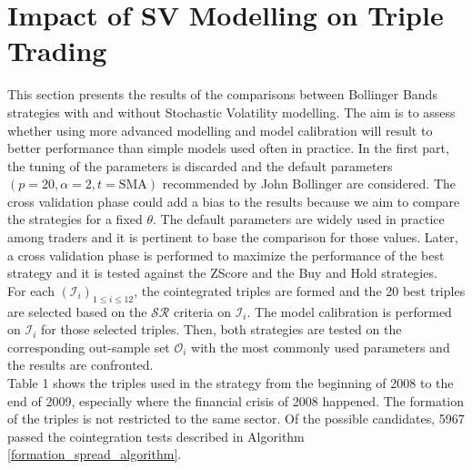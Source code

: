 \documentclass[11pt,a4,twosided,singlespacing,titlepagenumber=on]{scrreprt}
\numberwithin{equation}{chapter} %
\theoremstyle{remark}
\begin{document}
\section{Impact of SV Modelling on Triple Trading}
This section presents the results of the comparisons between Bollinger Bands strategies with and without Stochastic Volatility modelling. The aim is to assess whether using more advanced modelling and model calibration will result to better performance than simple models used often in practice. In the first part, the tuning of the parameters is discarded and the default parameters $(p=20, \alpha = 2, t = \text{SMA})$ recommended by John Bollinger are considered. The cross validation phase could add a bias to the results because we aim to compare the strategies for a fixed $\theta$. The default parameters are widely used in practice among traders and it is pertinent to base the comparison for those values. Later, a cross validation phase is performed to maximize the performance of the best strategy and it is tested against the ZScore and the Buy and Hold strategies. \\

For each $(\mathcal{I}_i)_{1 \leq i \leq 12}$, the cointegrated triples are formed and the 20 best triples are selected based on the $\mathcal{SR}$ criteria on $\mathcal{I}_i$. The model calibration is performed on $\mathcal{I}_i$ for those selected triples. Then, both strategies are tested on the corresponding out-sample set $\mathcal{O}_i$ with the most commonly used parameters and the results are confronted. \\

Table 1 shows the triples used in the strategy from the beginning of 2008 to the end of 2009, especially where the financial crisis of 2008 happened. The formation of the triples is not restricted to the same sector. Of the possible candidates, 5967 passed the cointegration tests described in Algorithm \ref{formation_spread_algorithm}.
\end{document}

